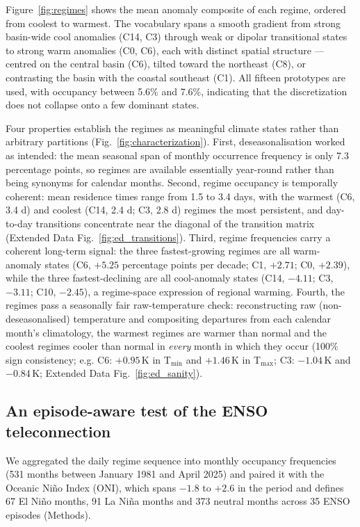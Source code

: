 \documentclass[pdflatex,sn-nature]{sn-jnl}
\begin{document}
Figure~\ref{fig:regimes} shows the mean anomaly composite of each regime, ordered from coolest to warmest. The vocabulary spans a smooth gradient from strong basin-wide cool anomalies (C14, C3) through weak or dipolar transitional states to strong warm anomalies (C0, C6), each with distinct spatial structure --- centred on the central basin (C6), tilted toward the northeast (C8), or contrasting the basin with the coastal southeast (C1). All fifteen prototypes are used, with occupancy between 5.6\% and 7.6\%, indicating that the discretization does not collapse onto a few dominant states.

Four properties establish the regimes as meaningful climate states rather than arbitrary partitions (Fig.~\ref{fig:characterization}). First, deseasonalisation worked as intended: the mean seasonal span of monthly occurrence frequency is only 7.3 percentage points, so regimes are available essentially year-round rather than being synonyms for calendar months. Second, regime occupancy is temporally coherent: mean residence times range from 1.5 to 3.4 days, with the warmest (C6, 3.4 d) and coolest (C14, 2.4 d; C3, 2.8 d) regimes the most persistent, and day-to-day transitions concentrate near the diagonal of the transition matrix (Extended Data Fig.~\ref{fig:ed_transitions}). Third, regime frequencies carry a coherent long-term signal: the three fastest-growing regimes are all warm-anomaly states (C6, $+5.25$ percentage points per decade; C1, $+2.71$; C0, $+2.39$), while the three fastest-declining are all cool-anomaly states (C14, $-4.11$; C3, $-3.11$; C10, $-2.45$), a regime-space expression of regional warming. Fourth, the regimes pass a seasonally fair raw-temperature check: reconstructing raw (non-deseasonalised) temperature and compositing departures from each calendar month's climatology, the warmest regimes are warmer than normal and the coolest regimes cooler than normal in \emph{every} month in which they occur (100\% sign consistency; e.g. C6: $+0.95$\,K in T$_{\min}$ and $+1.46$\,K in T$_{\max}$; C3: $-1.04$\,K and $-0.84$\,K; Extended Data Fig.~\ref{fig:ed_sanity}).

\subsection{An episode-aware test of the ENSO teleconnection}\label{sec:stats}

We aggregated the daily regime sequence into monthly occupancy frequencies (531 months between January 1981 and April 2025) and paired it with the Oceanic Ni\~no Index (ONI)\cite{noaa_oni_index}, which spans $-1.8$ to $+2.6$ in the period and defines 67 El Ni\~no months, 91 La Ni\~na months and 373 neutral months across 35 ENSO episodes (Methods).
\end{document}
